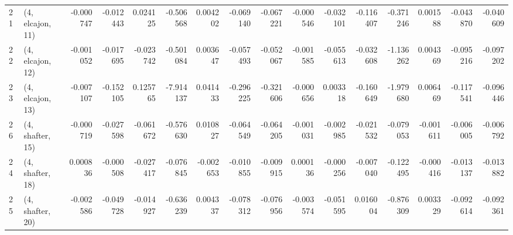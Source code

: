 \begin{tabular}{llrrrrrrrrrrrrrr}
21 &  (4, elcajon, 11) &  -0.000747 & -0.012443 &  0.024125 &  -0.506568 &  0.004202 &  -0.069140 & -0.067221 & -0.000546 & -0.032101 & -0.116407 &  -0.371246 &  0.001588 & -0.043870 & -0.040609 \\
22 &  (4, elcajon, 12) &  -0.001052 & -0.017695 & -0.023742 &  -0.501084 &  0.003647 &  -0.057493 & -0.052067 & -0.001585 & -0.055613 & -0.032608 &  -1.136262 &  0.004369 & -0.095216 & -0.097202 \\
23 &  (4, elcajon, 13) &  -0.007107 & -0.152105 &  0.125765 &  -7.914137 &  0.041433 &  -0.296225 & -0.321606 & -0.000656 &  0.003318 & -0.160649 &  -1.979680 &  0.006469 & -0.117541 & -0.096446 \\
26 &  (4, shafter, 15) &  -0.000719 & -0.027598 & -0.061672 &  -0.576630 &  0.010827 &  -0.064549 & -0.064205 & -0.001031 & -0.002985 & -0.021532 &  -0.079053 & -0.001611 & -0.006005 & -0.006792 \\
24 &  (4, shafter, 18) &   0.000836 & -0.000508 & -0.027417 &  -0.076845 & -0.002653 &  -0.010855 & -0.009915 &  0.000136 & -0.000256 & -0.007040 &  -0.122495 & -0.000416 & -0.013137 & -0.013882 \\
25 &  (4, shafter, 20) &  -0.002586 & -0.049728 & -0.014927 &  -0.636239 &  0.004337 &  -0.078312 & -0.076956 & -0.003574 & -0.051595 &  0.016004 &  -0.876309 &  0.003329 & -0.092614 & -0.092361 \\
\bottomrule
\end{tabular}
